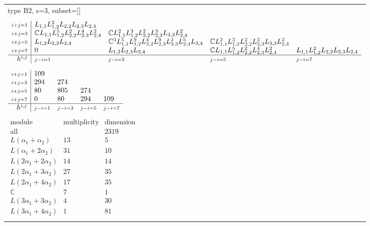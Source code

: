 \documentclass[crop,border=2mm]{standalone}
\begin{document}
\begin{tabular}{l}
{\huge type B2, s=3, subset=[]}\\ \\


$\displaystyle
\begin{array}{r|l l l l}
	{\scriptstyle i+j=1}&L_{1,1}L_{1,2}^{2}L_{2,2}L_{2,3}L_{2,4}&&&\\
	{\scriptstyle i+j=3}&\mathbb{C}L_{1,1}L_{1,2}^{5}L_{2,2}^{2}L_{2,3}^{4}L_{2,4}^{2}&\mathbb{C}L_{1,1}^{2}L_{1,2}^{3}L_{2,2}^{2}L_{2,3}^{3}L_{3,3}L_{2,4}^{2}&&\\
	{\scriptstyle i+j=5}&L_{1,2}L_{2,3}L_{2,4}&\mathbb{C}^{3}L_{1,1}^{5}L_{1,2}^{9}L_{2,2}^{4}L_{2,3}^{9}L_{3,3}^{2}L_{2,4}^{5}L_{3,4}&\mathbb{C}L_{1,1}^{2}L_{1,2}^{3}L_{2,2}^{2}L_{2,3}^{3}L_{3,3}L_{2,4}^{2}&\\
	{\scriptstyle i+j=7}&0&L_{1,2}L_{2,3}L_{2,4}&\mathbb{C}L_{1,1}L_{1,2}^{5}L_{2,2}^{2}L_{2,3}^{4}L_{2,4}^{2}&L_{1,1}L_{1,2}^{2}L_{2,2}L_{2,3}L_{2,4}\\
	\hline h^{i,j}&{\scriptstyle j-i=1}&{\scriptstyle j-i=3}&{\scriptstyle j-i=5}&{\scriptstyle j-i=7}
\end{array}
$ \\ \\


$\displaystyle
\begin{array}{r|l l l l}
	{\scriptstyle i+j=1}&109&&&\\
	{\scriptstyle i+j=3}&294&274&&\\
	{\scriptstyle i+j=5}&80&805&274&\\
	{\scriptstyle i+j=7}&0&80&294&109\\
	\hline h^{i,j}&{\scriptstyle j-i=1}&{\scriptstyle j-i=3}&{\scriptstyle j-i=5}&{\scriptstyle j-i=7}
\end{array}
$ \\ \\


$\displaystyle
\begin{array}{rll}
	\text{module}&\text{multiplicity}&\text{dimension} \\ \hline \text{all}&&2319 \\
	L\left(\alpha_{1}+\alpha_{2}\right)&13&5\\
	L\left(\alpha_{1}+ 2\alpha_{2}\right)&31&10\\
	L\left( 2\alpha_{1}+ 2\alpha_{2}\right)&14&14\\
	L\left( 2\alpha_{1}+ 3\alpha_{2}\right)&27&35\\
	L\left( 2\alpha_{1}+ 4\alpha_{2}\right)&17&35\\
	\mathbb{C}&7&1\\
	L\left( 3\alpha_{1}+ 3\alpha_{2}\right)&4&30\\
	L\left( 3\alpha_{1}+ 4\alpha_{2}\right)&1&81
\end{array}
$ \\ \\

\end{tabular}
\end{document}
